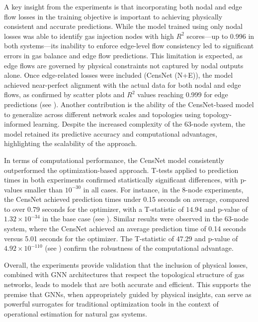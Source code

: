 A key insight from the experiments is that incorporating both nodal and edge flow losses in the training objective is important to achieving physically consistent and accurate predictions. While the model trained using only nodal losses was able to identify gas injection nodes with high $R^2$ scores—up to 0.996 in both systems—its inability to enforce edge-level flow consistency led to significant errors in gas balance and edge flow predictions. This limitation is expected, as edge flows are governed by physical constraints not captured by nodal outputs alone. Once edge-related losses were included (CensNet (N+E)), the model achieved near-perfect alignment with the actual data for both nodal and edge flows, as confirmed by scatter plots and $R^2$ values reaching 0.999 for edge predictions (see ). Another contribution is the ability of the CensNet-based model to generalize across different network scales and topologies using topology-informed learning. Despite the increased complexity of the 63-node system, the model retained its predictive accuracy and computational advantages, highlighting the scalability of the approach.

In terms of computational performance, the CensNet model consistently outperformed the optimization-based approach. T-tests applied to prediction times in both experiments confirmed statistically significant differences, with p-values smaller than $10^{-30}$ in all cases. For instance, in the 8-node experiments, the CensNet achieved prediction times under 0.15 seconds on average, compared to over 0.79 seconds for the optimizer, with a T-statistic of $14.94$ and p-value of $1.32 \times 10^{-34}$ in the base case (see ). Similar results were observed in the 63-node system, where the CensNet achieved an average prediction time of 0.14 seconds versus 5.01 seconds for the optimizer. The T-statistic of $47.29$ and p-value of $4.92 \times 10^{-110}$ (see ) confirm the robustness of the computational advantage.

Overall, the experiments provide validation that the inclusion of physical losses, combined with GNN architectures that respect the topological structure of gas networks, leads to models that are both accurate and efficient. This supports the premise that GNNs, when appropriately guided by physical insights, can serve as powerful surrogates for traditional optimization tools in the context of operational estimation for natural gas systems.


